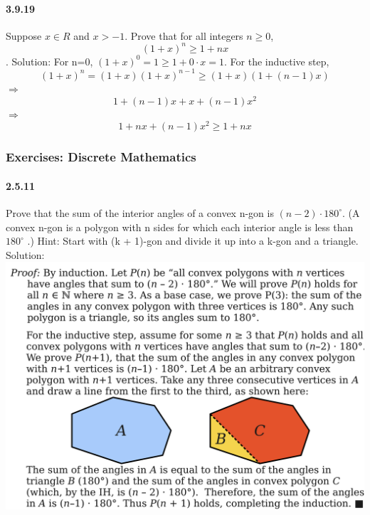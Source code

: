 \documentclass{article}
\begin{document}
\paragraph{3.9.19}
Suppose $x\in R$ and $x>-1$. Prove that for all integers $n\ge 0$, $$(1+x)^n\ge 1+nx$$.\newline
Solution:\newline
For n=0, $(1+x)^0=1 \ge 1 +0\cdot x=1$. For the inductive step,
$$(1+x)^n=(1+x)(1+x)^{n-1}\ge (1+x)(1+(n-1)x)$$
$\Longrightarrow$
$$1+(n-1)x+x+(n-1)x^2$$
$\Longrightarrow$
$$1+nx+(n-1)x^2\ge 1+nx$$
\subsubsection{Exercises: Discrete Mathematics}
\paragraph{2.5.11}
Prove that the sum of the interior angles of a convex n-gon is $(n-2)\cdot 180^{\circ}$.
(A convex n-gon is a polygon with n sides for which each interior
angle is less than $180^{\circ}$
.)\newline
Hint:\newline
Start with (k + 1)-gon and divide it up into a k-gon and a triangle.\newline
Solution:\newline
\includegraphics{0010}
\end{document}
